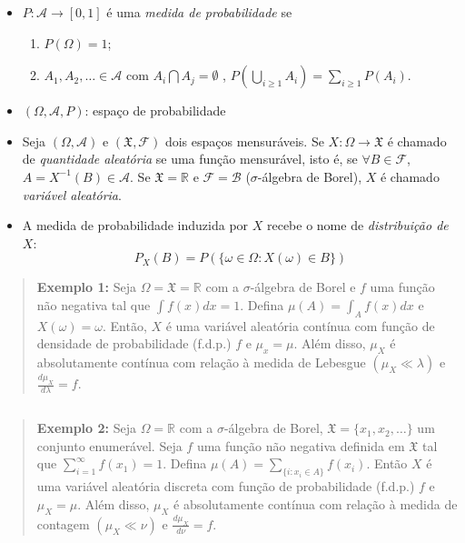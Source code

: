 \documentclass[
]{book}
\providecommand{\tightlist}{%
  \setlength{\itemsep}{0pt}\setlength{\parskip}{0pt}}
\begin{document}
\(~\)

\begin{itemize}
\item
  \(P: \mathcal{A} \longrightarrow [0,1]\) é uma \emph{medida de probabilidade} se

  \begin{enumerate}
  \def\labelenumi{\arabic{enumi}.}
  \tightlist
  \item
    \(P(\Omega) = 1\);
  \item
    \(\displaystyle A_1, A_2, \ldots \in \mathcal{A}\) com \(A_i \bigcap A_j = \emptyset\) , \(\displaystyle P\left(\bigcup_{i \geq 1} A_i\right) = \sum_{i \geq 1} P\left(A_i\right)\).
  \end{enumerate}
\item
  \((\Omega, \mathcal{A}, P)\): espaço de probabilidade
\item
  Seja \((\Omega,\mathcal{A})\) e \((\mathfrak{X},\mathcal{F})\) dois espaços mensuráveis. Se \(X: \Omega \longrightarrow \mathfrak{X}\) é chamado de \emph{quantidade aleatória} se uma função mensurável, isto é, se \(\forall B \in \mathcal{F}\), \(A = X^{-1}(B) \in \mathcal{A}\). Se \(\mathfrak{X} = \mathbb{R}\) e \(\mathcal{F}=\mathcal{B}\) (\(\sigma\)-álgebra de Borel), \(X\) é chamado \emph{variável aleatória}.
\item
  A medida de probabilidade induzida por \(X\) recebe o nome de \emph{distribuição de} \(X\):
  \[P_X(B) = P(\{\omega \in \Omega :  X(\omega) \in B\})\]
\end{itemize}

\begin{quote}
\textbf{Exemplo 1:} Seja \(\Omega=\mathfrak{X}=\mathbb{R}\) com a \(\sigma\)-álgebra de Borel e \(f\) uma função não negativa tal que \(\int f(x) dx = 1\). Defina \(\displaystyle\mu(A)= \int_A f(x) dx\) e \(X(\omega)=\omega\). Então, \(X\) é uma variável aleatória contínua com função de densidade de probabilidade (f.d.p.) \(f\) e \(\mu_x = \mu\). Além disso, \(\mu_X\) é absolutamente contínua com relação à medida de Lebesgue \((\mu_X \ll \lambda)\) e \(\frac{d\mu_X}{d\lambda}=f\).
\end{quote}

\(~\)

\begin{quote}
\textbf{Exemplo 2:} Seja \(\Omega=\mathbb{R}\) com a \(\sigma\)-álgebra de Borel, \(\mathfrak{X} = \{x_1,x_2,\ldots\}\) um conjunto enumerável. Seja \(f\) uma função não negativa definida em \(\mathfrak{X}\) tal que \(\displaystyle \sum_{i=1}^{\infty} f(x_1) = 1\). Defina \(\displaystyle \mu(A) = \sum_{\{i: x_i \in A\}} f(x_i)\). Então \(X\) é uma variável aleatória discreta com função de probabilidade (f.d.p.) \(f\) e \(\mu_X=\mu\). Além disso, \(\mu_X\) é absolutamente contínua com relação à medida de contagem \((\mu_X \ll \nu)\) e \(\frac{d\mu_X}{d\nu}=f\).
\end{quote}
\end{document}
